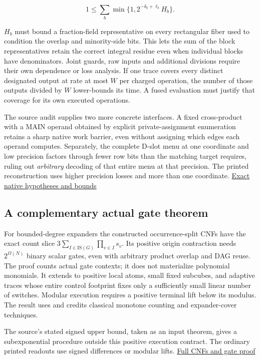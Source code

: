 \documentclass[11pt,a4paper]{article}
\begin{document}
\[
 1\le\sum_b\min\{1,2^{-\delta_b+\ell_b}H_b\}. \tag{U7}
\]

\(H_b\) must bound a fraction-field representative on every rectangular
fiber used to condition the overlap and minority-side bits. This lets
the sum of the block representatives retain the correct integral residue
even when individual blocks have denominators. Joint guards, raw inputs
and additional divisions require their own dependence or loss analysis.
If one trace covers every distinct designated output at rate at most
\(W\) per charged operation, the number of those outputs divided by
\(W\) lower-bounds its time. A fused evaluation must justify that
coverage for its own executed operations.

The source audit supplies two more concrete interfaces. A fixed
cross-product with a MAIN operand obtained by explicit
private-assignment enumeration retains a sharp native work barrier, even
without assigning which edges each operand computes. Separately, the
complete D-slot menu at one coordinate and low precision factors through
fewer row bits than the matching target requires, ruling out
\emph{arbitrary} decoding of that entire menu at that precision. The
printed reconstruction uses higher precision losses and more than one
coordinate. \hyperref[v8-section-native-escape]{Exact native hypotheses and
bounds}

\subsection{A complementary actual gate
theorem}\label{v8-a-complementary-actual-gate-theorem}

For bounded-degree expanders the constructed occurrence-split CNFs have
the exact count slice \(3\sum_{I\in\mathrm{IS}(G)}\prod_{v\in I}s_v\).
Its positive origin contraction needs \(2^{\Omega(N)}\) binary scalar
gates, even with arbitrary product overlap and DAG reuse. The proof
counts actual gate contexts; it does not materialize polynomial
monomials. It extends to positive local atoms, small fixed subcubes, and
adaptive traces whose entire control footprint fixes only a sufficiently
small linear number of switches. Modular execution requires a positive
terminal lift below its modulus. The result uses and credits classical
monotone counting and expander-cover techniques.

The source's stated signed upper bound, taken as an input theorem, gives
a subexponential procedure outside this positive execution contract. The
ordinary printed readouts use signed differences or modular lifts.
\hyperref[v8-section-stronger-family]{Full CNFs and gate proof}
\end{document}
